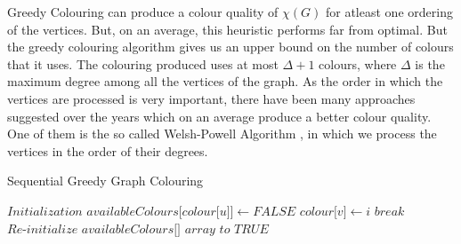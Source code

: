 \documentclass[MTech]{iitmdiss}
\begin{document}
Greedy Colouring can produce a colour quality of $\chi(G)$ for atleast one ordering of the vertices. But, on an average, this heuristic performs far from optimal. But the greedy colouring algorithm gives us an upper bound on the number of colours that it uses. The colouring produced uses at most $\Delta+1$ colours, where $\Delta$ is the maximum degree among all the vertices of the graph. As the order in which the vertices are processed is very important, there have been many approaches suggested over the years which on an average produce a better colour quality. One of them is the so called Welsh-Powell Algorithm \citep{Welsh01011967}, in which we process the vertices in the order of their degrees.
\begin{algorithm}
\caption{Sequential Greedy Graph Colouring}\label{GreedyColouring}
\begin{algorithmic}[1]
\State $\textit{Initialization}$
 \label{3.3}
 \label{3.4}
 \label{3.5}
\State $\textit{availableColours[colour[u]]} \gets FALSE$ \label{3.6}
\EndIf 
\EndFor
{} \label{3.7}
 \label{3.8}
\State $\textit{colour[v]} \gets i$ \label{3.9}
\State $\textit{break}$
\EndIf 
\EndFor
\State $\textit{Re-initialize availableColours[] array to TRUE}$ \label{3.11}
\EndFor
\EndProcedure
\end{algorithmic}
\end{algorithm}
\end{document}
